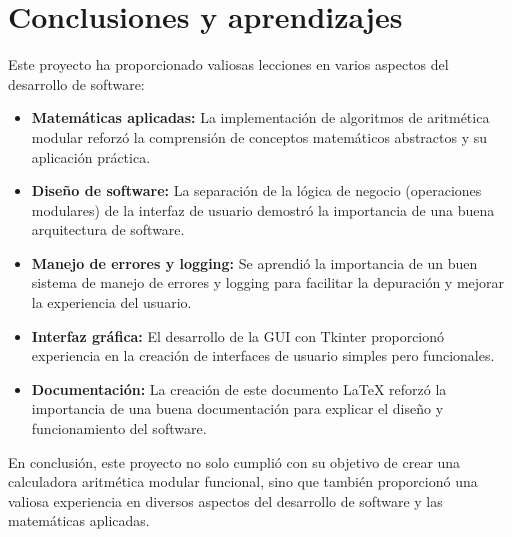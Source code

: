\documentclass{article}
\begin{document}
\section{Conclusiones y aprendizajes}

Este proyecto ha proporcionado valiosas lecciones en varios aspectos del desarrollo de software:

\begin{itemize}
    \item \textbf{Matemáticas aplicadas:} La implementación de algoritmos de aritmética modular reforzó la comprensión de conceptos matemáticos abstractos y su aplicación práctica.
    
    \item \textbf{Diseño de software:} La separación de la lógica de negocio (operaciones modulares) de la interfaz de usuario demostró la importancia de una buena arquitectura de software.
    
    \item \textbf{Manejo de errores y logging:} Se aprendió la importancia de un buen sistema de manejo de errores y logging para facilitar la depuración y mejorar la experiencia del usuario.
    
    \item \textbf{Interfaz gráfica:} El desarrollo de la GUI con Tkinter proporcionó experiencia en la creación de interfaces de usuario simples pero funcionales.
    
    \item \textbf{Documentación:} La creación de este documento LaTeX reforzó la importancia de una buena documentación para explicar el diseño y funcionamiento del software.
\end{itemize}

En conclusión, este proyecto no solo cumplió con su objetivo de crear una calculadora aritmética modular funcional, sino que también proporcionó una valiosa experiencia en diversos aspectos del desarrollo de software y las matemáticas aplicadas.
\end{document}
